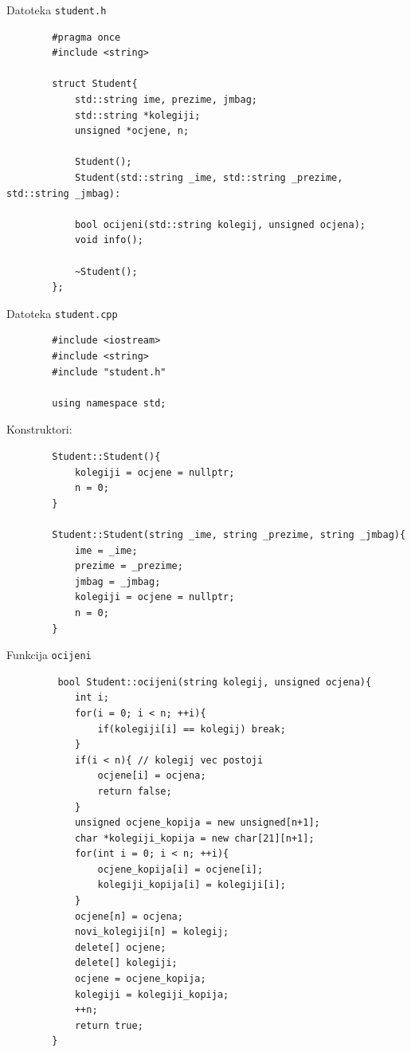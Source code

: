\begin{rjesenje}
    Datoteka \texttt{student.h}
    \begin{verbatim}
        #pragma once
        #include <string>

        struct Student{
            std::string ime, prezime, jmbag;
            std::string *kolegiji;
            unsigned *ocjene, n;

            Student();
            Student(std::string _ime, std::string _prezime, std::string _jmbag):

            bool ocijeni(std::string kolegij, unsigned ocjena);
            void info();

            ~Student();
        };
    \end{verbatim}
    Datoteka \texttt{student.cpp}

    \begin{verbatim}
        #include <iostream>
        #include <string>
        #include "student.h"

        using namespace std;
    \end{verbatim}

    Konstruktori:
    \begin{verbatim}
        Student::Student(){
            kolegiji = ocjene = nullptr;
            n = 0;
        }

        Student::Student(string _ime, string _prezime, string _jmbag){
            ime = _ime;
            prezime = _prezime;
            jmbag = _jmbag;
            kolegiji = ocjene = nullptr;
            n = 0;
        }
    \end{verbatim}

    Funkcija \texttt{ocijeni}

     \begin{verbatim}
         bool Student::ocijeni(string kolegij, unsigned ocjena){
            int i;
            for(i = 0; i < n; ++i){
                if(kolegiji[i] == kolegij) break;
            }
            if(i < n){ // kolegij vec postoji
                ocjene[i] = ocjena;
                return false;
            }
            unsigned ocjene_kopija = new unsigned[n+1];
            char *kolegiji_kopija = new char[21][n+1];
            for(int i = 0; i < n; ++i){
                ocjene_kopija[i] = ocjene[i];
                kolegiji_kopija[i] = kolegiji[i];
            }
            ocjene[n] = ocjena;
            novi_kolegiji[n] = kolegij;
            delete[] ocjene;
            delete[] kolegiji;
            ocjene = ocjene_kopija;
            kolegiji = kolegiji_kopija;
            ++n;
            return true;
        }
    \end{verbatim}
\end{rjesenje}

